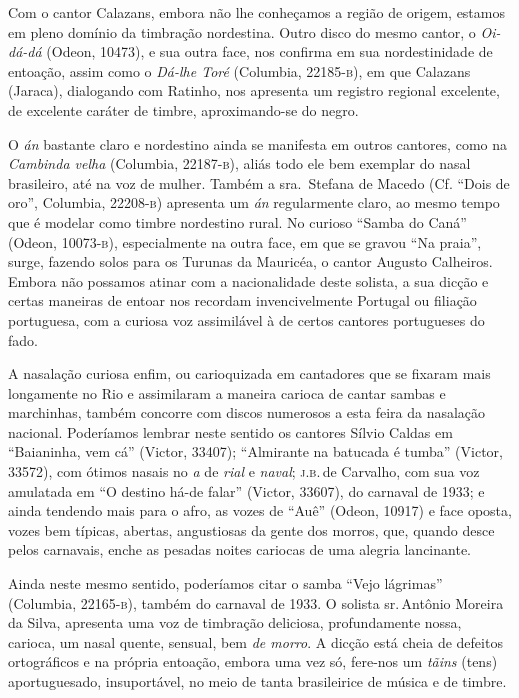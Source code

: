 Com o cantor Calazans, embora não lhe conheçamos a região de origem,
estamos em pleno domínio da timbração nordestina. Outro disco do mesmo
cantor, o \textit{Oi-dá-dá} (Odeon, 10473), e sua outra face, nos confirma em sua
nordestinidade de entoação, assim como o \textit{Dá-lhe Toré} (Columbia,
22185-\textsc{b}), em que Calazans (Jaraca), dialogando com Ratinho, nos
apresenta um registro regional excelente, de excelente caráter de
timbre, aproximando-se do negro.

O \textit{án} bastante claro e nordestino ainda se manifesta em outros cantores,
como na \textit{Cambinda velha} (Columbia, 22187-\textsc{b}), aliás todo ele bem exemplar
do nasal brasileiro, até na voz de mulher. Também a sra.\, Stefana de
Macedo (Cf. ``Dois de oro'', Columbia, 22208-\textsc{b}) apresenta um \textit{án}
regularmente claro, ao mesmo tempo que é modelar como timbre nordestino
rural. No curioso ``Samba do Caná'' (Odeon, 10073-\textsc{b}), especialmente na outra
face, em que se gravou ``Na praia'', surge, fazendo solos para os
Turunas da Mauricéa, o cantor Augusto Calheiros. Embora não possamos
atinar com a nacionalidade deste solista, a sua dicção e certas maneiras
de entoar nos recordam invencivelmente Portugal ou filiação portuguesa,
com a curiosa voz assimilável à de certos cantores portugueses do fado.

A nasalação curiosa enfim, ou carioquizada em cantadores que se fixaram
mais longamente no Rio e assimilaram a maneira carioca de cantar sambas
e marchinhas, também concorre com discos numerosos a esta feira da
nasalação nacional. Poderíamos lembrar neste sentido os cantores Sílvio
Caldas em ``Baianinha, vem cá'' (Victor, 33407); ``Almirante na batucada é
tumba'' (Victor, 33572), com ótimos nasais no \textit{a} de \textit{rial} e \textit{naval};
\textsc{j.b.}\,de Carvalho, com sua voz amulatada em ``O destino há-de falar''
(Victor, 33607), do carnaval de 1933; e ainda tendendo mais para o afro,
as vozes de ``Auê'' (Odeon, 10917) e face oposta, vozes bem típicas,
abertas, angustiosas da gente dos morros, que, quando desce pelos
carnavais, enche as pesadas noites cariocas de uma alegria lancinante.

Ainda neste mesmo sentido, poderíamos citar o samba ``Vejo lágrimas''
(Columbia, 22165-\textsc{b}), também do carnaval de 1933. O solista sr.\,Antônio
Moreira da Silva, apresenta uma voz de timbração deliciosa,
profundamente nossa, carioca, um nasal quente, sensual, bem \textit{de
morro}. A dicção está cheia de defeitos ortográficos e na própria
entoação, embora uma vez só, fere-nos um \textit{tãins} (tens) aportuguesado,
insuportável, no meio de tanta brasileirice de música e de timbre.

